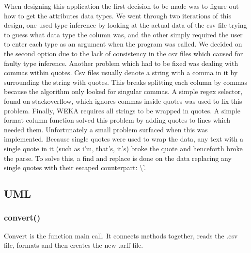 \documentclass[11pt]{article} %
\begin{document}
When designing this application the first decision to be made was to figure out how to get the attributes data types. We went through two iterations of this design, one used type inference by looking at the actual data of the csv file trying to guess what data type the column was, and the other simply required the user to enter each type as an argument when the program was called. We decided on the second option due to the lack of consistency in the csv files which caused for faulty type inference. Another problem which had to be fixed was dealing with commas within quotes. Csv files usually denote a string with a comma in it by surrounding the string with quotes. This breaks splitting each column by commas because the algorithm only looked for singular commas. A simple regex selector, found on stackoverflow, which ignores commas inside quotes was used to fix this problem. Finally, WEKA requires all strings to be wrapped in quotes. A simple format column function solved this problem by adding quotes to lines which needed them. Unfortunately a small problem surfaced when this was implemented. Because single quotes were used to wrap the data, any text with a single quote in it (such as i'm, that's, it's) broke the quote and henceforth broke the parse. To solve this, a find and replace is done on the data replacing any single quotes with their escaped counterpart: \textbackslash'.

\subsection{UML}
\begin{center}
\end{center}

\subsubsection{convert()}
Convert is the function main call. It connects methods together, reads the .csv file, formats and then creates the new .arff file.
\end{document}
